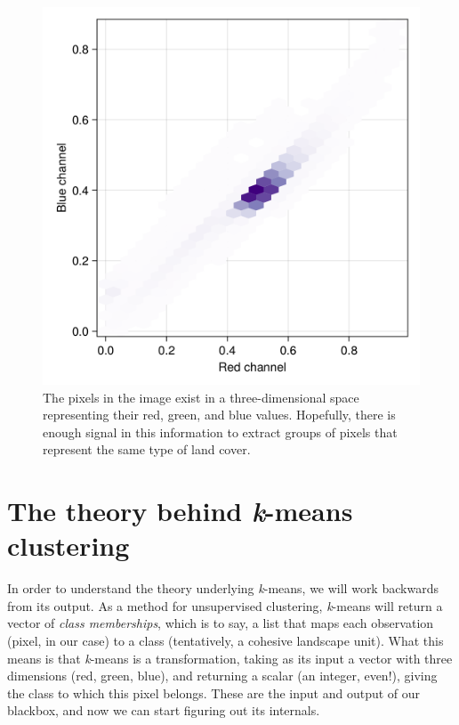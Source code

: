 \documentclass[
  letterpaper,
]{scrbook}
\begin{document}
\begin{figure}

{\centering \includegraphics{chapters/kmeans_files/figure-latex/fig-hexbin-output-1.png}

}

\caption{\label{fig-hexbin}The pixels in the image exist in a
three-dimensional space representing their red, green, and blue values.
Hopefully, there is enough signal in this information to extract groups
of pixels that represent the same type of land cover.}

\end{figure}

\hypertarget{the-theory-behind-k-means-clustering}{%
\section{\texorpdfstring{The theory behind \emph{k}-means
clustering}{The theory behind k-means clustering}}\label{the-theory-behind-k-means-clustering}}

In order to understand the theory underlying \emph{k}-means, we will
work backwards from its output. As a method for unsupervised clustering,
\emph{k}-means will return a vector of \emph{class memberships}, which
is to say, a list that maps each observation (pixel, in our case) to a
class (tentatively, a cohesive landscape unit). What this means is that
\emph{k}-means is a transformation, taking as its input a vector with
three dimensions (red, green, blue), and returning a scalar (an integer,
even!), giving the class to which this pixel belongs. These are the
input and output of our blackbox, and now we can start figuring out its
internals.
\end{document}
